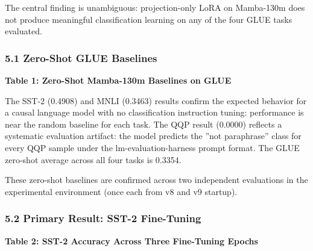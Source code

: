
The central finding is unambiguous: projection-only LoRA on Mamba-130m does not produce meaningful classification learning on any of the four GLUE tasks evaluated.

\subsubsection{5.1 Zero-Shot GLUE Baselines}

\textbf{Table 1: Zero-Shot Mamba-130m Baselines on GLUE}

\begin{table}[htbp]
\centering
{}
\end{table}

The SST-2 (0.4908) and MNLI (0.3463) results confirm the expected behavior for a causal language model with no classification instruction tuning: performance is near the random baseline for each task. The QQP result (0.0000) reflects a systematic evaluation artifact: the model predicts the ''not paraphrase'' class for every QQP sample under the lm-evaluation-harness prompt format. The GLUE zero-shot average across all four tasks is 0.3354.

These zero-shot baselines are confirmed across two independent evaluations in the experimental environment (once each from v8 and v9 startup).

\subsubsection{5.2 Primary Result: SST-2 Fine-Tuning}

\textbf{Table 2: SST-2 Accuracy Across Three Fine-Tuning Epochs}

\begin{table}[htbp]
\centering
{}
\end{table}

